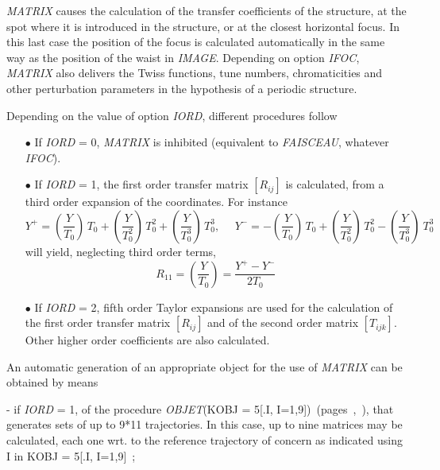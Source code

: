 \textsl{MATRIX}  causes the calculation of the transfer coefficients of the 
structure, at the spot where it is introduced in the structure, or at the closest horizontal 
focus.  In this last case the position of 
the focus is calculated automatically in the same way as the position of the 
waist in \textsl{IMAGE}. Depending on option \textsl{IFOC},  \textsl{MATRIX} also
delivers the Twiss functions, tune numbers, chromaticities 
 and other perturbation parameters in the hypothesis of a periodic structure.  


\bigskip

\noindent Depending on the value of option \textsl{IORD}, different procedures follow   

\medskip

\begin{itemize}
\item[$\bullet$] If \textsl{IORD} = 0, \textsl{MATRIX}  is inhibited (equivalent to 
\textsl{FAISCEAU}, whatever \textsl{IFOC}). 

\item[$\bullet$] If \textsl{IORD} = 1, the first order transfer matrix 
$ [R_{ij}]$ is calculated, from a third order expansion of the coordinates. For instance 
$$  Y^+    =   \left( \dfrac{Y}{T_0} \right)\, T_0
	             + \left(\dfrac{Y }{ T^2_0} \right)\, T^2_0 
	             + \left(\dfrac{Y }{ T^3_0} \right)\, T^3_0,   ~ ~ ~ ~ ~ ~ 
	 Y^-    =    - \left(\dfrac{Y }{ T_0} \right)\, T_0 
	             + \left(\dfrac{Y }{ T^2_0} \right)\, T^2_0 -
	             \left(\dfrac{Y }{ T^3_0} \right)\ T^3_0 $$
\noindent will yield, neglecting third order terms, 
$$          R_{11} = \left(\dfrac{Y }{ T_0} \right) = \dfrac{Y^+-Y^- }{ 2T_0} $$


\item[$\bullet$] If \textsl{IORD} = 2, fifth order Taylor expansions are used for the 
calculation of the first order transfer matrix $ [R_{ij}] $ and of 
the second order matrix $[T_{ijk}]$.  Other higher order coefficients are also calculated. 
\end{itemize}

\bigskip

\noindent An automatic generation of an appropriate object for the use of \textsl{MATRIX}  can be obtained 
by means 

\noindent - if  \textsl{IORD} = 1, of the procedure 
\textsl{OBJET}(KOBJ = 5[.I, I=1,9])~(pages~\pageref{OBJET},~\pageref{OBJET-B}),  
that generates sets of up to 9*11 trajectories. In this case, up to nine matrices 
may be calculated, each one wrt. to the reference trajectory of concern as 
indicated using I in KOBJ = 5[.I, I=1,9]~;  

